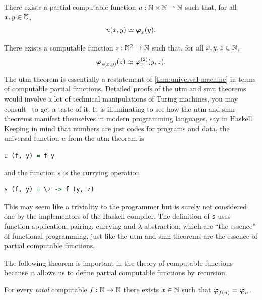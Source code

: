 \begin{theorem}[utm]
  There exists a partial computable function $u : \mathbb{N} \times
  \mathbb{N} \mathbin{\rightharpoonup} \mathbb{N}$ such that, for all $x, y \in \mathbb{N}$,
  \begin{equation*}
    u(x,y) \simeq \text{\boldmath{$\varphi$}}_{x}(y).
  \end{equation*}
\end{theorem}

\begin{theorem}[smn]
  There exists a computable function $s :
  \mathbb{N}^2 \to \mathbb{N}$ such that, for all $x, y, z \in \mathbb{N}$,
  \begin{equation*}
    \text{\boldmath{$\varphi$}}_{s(x, y)}(z) \simeq \text{\boldmath{$\varphi$}}^{(2)}_{x}(y,z).
  \end{equation*}
\end{theorem}

\noindent
The utm theorem is essentially a restatement of
\cref{thm:universal-machine} in terms of computable partial
functions. Detailed proofs of the utm and smn theorems would involve
a lot of technical manipulations of Turing machines, you may consult~ to get a taste of it.
It is illuminating to see how the utm and smn theorems manifest themselves in modern programming languages, say in Haskell. Keeping in mind that numbers are just codes for programs and data, the universal function $u$ from the utm theorem is
%
\begin{lstlisting}[language=Haskell]
u (f, y) = f y
\end{lstlisting}
%
and the function $s$ is the currying operation
%
\begin{lstlisting}[language=Haskell]
s (f, y) = \z -> f (y, z)
\end{lstlisting}
%
This may seem like a triviality to the programmer but is surely not
considered one by the implementors of the Haskell compiler. The definition of \lstinline!s! uses function application, pairing, currying and $\lambda$-abstraction, which are ``the essence'' of functional programming, just like the utm and smn theorems are the essence of partial computable functions.

The following theorem is important in the theory of computable
functions because it allows us to define partial computable functions
by recursion.

\begin{theorem}
  For every \emph{total} computable $f : \mathbb{N} \to \mathbb{N}$ there exists $x
  \in \mathbb{N}$ such that $\text{\boldmath{$\varphi$}}_{f(n)} = \text{\boldmath{$\varphi$}}_{n}$.
\end{theorem}


